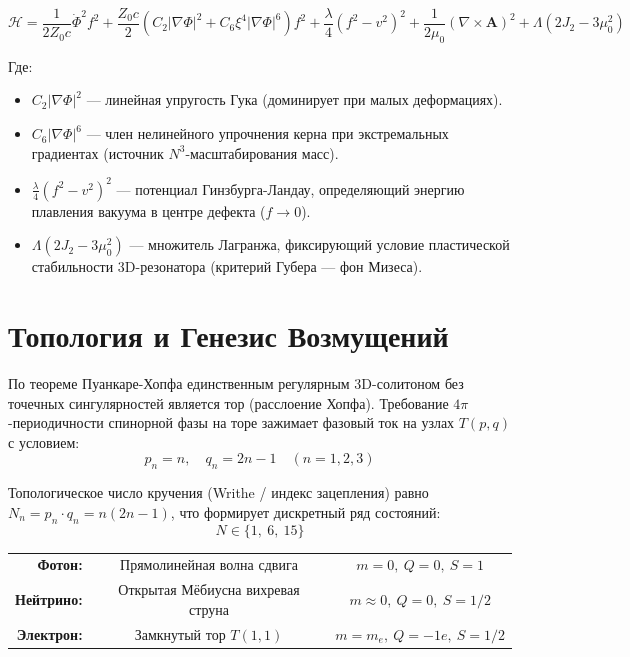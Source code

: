 \documentclass[12pt,a4paper]{article}
\begin{document}
			\begin{equation}
				\mathcal{H} = \frac{1}{2 Z_0 c} \dot{\Phi}^2 f^2 + \frac{Z_0 c}{2} \left( C_2 |\nabla \Phi|^2 + C_6 \xi^4 |\nabla \Phi|^6 \right) f^2 + \frac{\lambda}{4}(f^2 - v^2)^2 + \frac{1}{2\mu_0}(\nabla \times \mathbf{A})^2 + \Lambda (2J_2 - 3\mu_0^2)
			\end{equation}
			
			Где:
			\begin{itemize}
				\item $C_2 |\nabla \Phi|^2$ — линейная упругость Гука (доминирует при малых деформациях).
				\item $C_6 |\nabla \Phi|^6$ — член нелинейного упрочнения керна при экстремальных градиентах (источник $N^3$-масштабирования масс).
				\item $\frac{\lambda}{4}(f^2 - v^2)^2$ — потенциал Гинзбурга-Ландау, определяющий энергию плавления вакуума в центре дефекта ($f \to 0$).
				\item $\Lambda (2J_2 - 3\mu_0^2)$ — множитель Лагранжа, фиксирующий условие пластической стабильности 3D-резонатора (критерий Губера — фон Мизеса).
			\end{itemize}
			
			\section{Топология и Генезис Возмущений}
			По теореме Пуанкаре-Хопфа единственным регулярным 3D-солитоном без точечных сингулярностей является тор (расслоение Хопфа). Требование $4\pi$-периодичности спинорной фазы на торе зажимает фазовый ток на узлах $T(p,q)$ с условием:
			\begin{equation}
				p_n = n, \quad q_n = 2n - 1 \quad (n = 1, 2, 3)
			\end{equation}
			
			Топологическое число кручения (Writhe / индекс зацепления) равно $N_n = p_n \cdot q_n = n(2n-1)$, что формирует дискретный ряд состояний:
			\begin{equation}
				N \in \{1, \ 6, \ 15\}
			\end{equation}
			
			
				\begin{tabular}{rcc}
					\textbf{Фотон:} & Прямолинейная волна сдвига & $m=0, \ Q=0, \ S=1$ \\
					\textbf{Нейтрино:} & Открытая Мёбиусна вихревая струна & $m \approx 0, \ Q=0, \ S=1/2$ \\
					\textbf{Электрон:} & Замкнутый тор $T(1,1)$ & $m=m_e, \ Q=-1e, \ S=1/2$
				\end{tabular}
				
\end{document}
